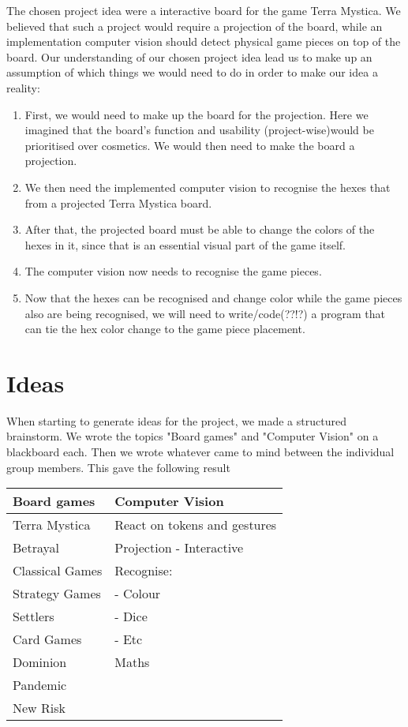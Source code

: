 The chosen project idea were a interactive board for the game Terra Mystica. We believed that such a project would require a projection of the board, while an implementation computer vision should detect physical game pieces on top of the board.
Our understanding of our chosen project idea lead us to make up an assumption of which things we would need to do in order to make our idea a reality:
\begin{enumerate}
\item First, we would need to make up the board for the projection. Here we imagined that the board's function and usability (project-wise)would be prioritised over cosmetics. We would then need to make the board a projection.
\item We then need the implemented computer vision to recognise the hexes that from a projected Terra Mystica board.
\item After that, the projected board must be able to change the colors of the hexes in it, since that is an essential visual part of the game itself.
\item The computer vision now needs to recognise the game pieces.
\item Now that the hexes can be recognised and change color while the game pieces also are being recognised, we will need to write/code(??!?) a program that can tie the hex color change to the game piece placement.
\end{enumerate}

\section{Ideas}\label{sec:idea}
When starting to generate ideas for the project, we made a structured brainstorm. We wrote the topics "Board games" and "Computer Vision" on a blackboard each. Then we wrote whatever came to mind between the individual group members. This gave the following result

\begin{tabular}{l | l}
Board games & Computer Vision\\
\hline
Terra Mystica & React on tokens and gestures\\
Betrayal & Projection - Interactive\\
Classical Games & Recognise:\\
Strategy Games & - Colour\\
Settlers & - Dice\\
Card Games & - Etc\\
Dominion & Maths\\
Pandemic & \\
New Risk & \\
\end{tabular}

